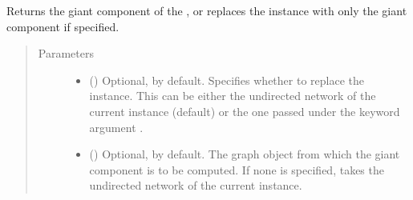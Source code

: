 \documentclass[letterpaper,10pt,english]{sphinxmanual}
\begin{document}
\begin{fulllineitems}
\begin{fulllineitems}
\begin{quote}
\begin{description}
\end{description}\end{quote}

\end{fulllineitems}


\begin{fulllineitems}
\label{\detokenize{main:pypath.main.PyPath.get_function}}
\end{fulllineitems}


\begin{fulllineitems}
\label{\detokenize{main:pypath.main.PyPath.get_giant}}
Returns the giant component of the , or replaces the
 instance with only the giant component
if specified.
\begin{quote}\begin{description}
\item[{Parameters}] \leavevmode\begin{itemize}
\item {} 
 () \textendash{} Optional,  by default. Specifies whether to replace
the  instance. This can be either
the undirected network of the current
{\hyperref[\detokenize{main:pypath.main.PyPath}]{}} instance (default) or the one
passed under the keyword argument .

\item {} 
 () \textendash{} Optional,  by default. The graph object from which
the giant component is to be computed. If none is specified,
takes the undirected network of the current
{\hyperref[\detokenize{main:pypath.main.PyPath}]{}} instance.

\end{itemize}


\end{description}
\end{quote}
\end{fulllineitems}
\end{fulllineitems}
\end{document}

